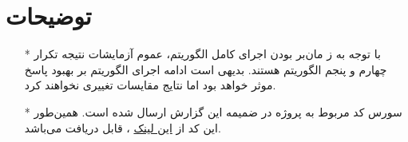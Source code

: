 \documentclass[11.5pt,a4paper]{article}
\begin{document}
\section{توضیحات}
\begin{itemize}
\item [*] با توجه به ز مان‌بر بودن اجرای کامل الگوریتم، عموم آزمایشات نتیجه تکرار چهارم و پنجم الگوریتم هستند. بدیهی  است ادامه اجرای الگوریتم بر بهبود پاسخ موثر خواهد بود اما نتایج مقایسات تغییری نخواهند کرد. 
\item [*] سورس کد مربوط به پروژه در ضمیمه این گزارش ارسال شده است. همین‌طور این کد از
\href{https://github.com/ahmad-asadi/PGM/tree/master/MarkovRandomField}
{این لینک}
، قابل 
دریافت می‌باشد.
\end{itemize}
\end{document}
